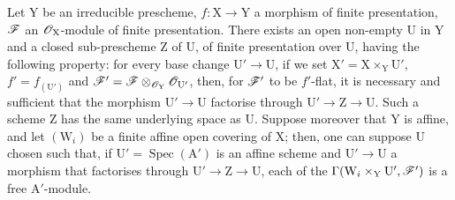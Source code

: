 \begin{proposition}[11.4.5]
\label{IV.11.4.5}
Let $\mathrm{Y}$ be an irreducible prescheme, $f:\mathrm{X}\to\mathrm{Y}$ a morphism of
finite presentation, $\mathscr{F}$ an $\mathscr{O}_\mathrm{X}$-module of finite presentation. There exists an open non-empty $\mathrm{U}$
in $\mathrm{Y}$ and a closed sub-prescheme $\mathrm{Z}$ of $\mathrm{U}$, of finite presentation over $\mathrm{U}$, having the following property:
for every base change $\mathrm{U}'\to\mathrm{U}$, if we set $\mathrm{X}'=\mathrm{X}\times_\mathrm{Y}\mathrm{U}'$, $f'=f_{(\mathrm{U}')}$ and $\mathscr{F}'=\mathscr{F}\otimes_{\mathscr{O}_\mathrm{Y}}\mathscr{O}_{\mathrm{U}'}$,
then, for $\mathscr{F}'$ to be $f'$-flat, it is necessary and sufficient that the morphism $\mathrm{U}'\to\mathrm{U}$ factorise
through $\mathrm{U}'\to\mathrm{Z}\to\mathrm{U}$. Such a scheme $\mathrm{Z}$ has the same underlying space as $\mathrm{U}$. Suppose moreover that $\mathrm{Y}$ is affine,
and let $(\mathrm{W}_i)$ be a finite affine open covering of $\mathrm{X}$; then, one can suppose $\mathrm{U}$ chosen
such that, if $\mathrm{U}'=\operatorname{Spec}(\mathrm{A}')$ is an affine scheme and $\mathrm{U}'\to\mathrm{U}$ a morphism that factorises
through $\mathrm{U}'\to\mathrm{Z}\to\mathrm{U}$, each of the $\Gamma(\mathrm{W}_i\times_\mathrm{Y}\mathrm{U}',\mathscr{F}')$ is a free $\mathrm{A}'$-module.
\end{proposition}

